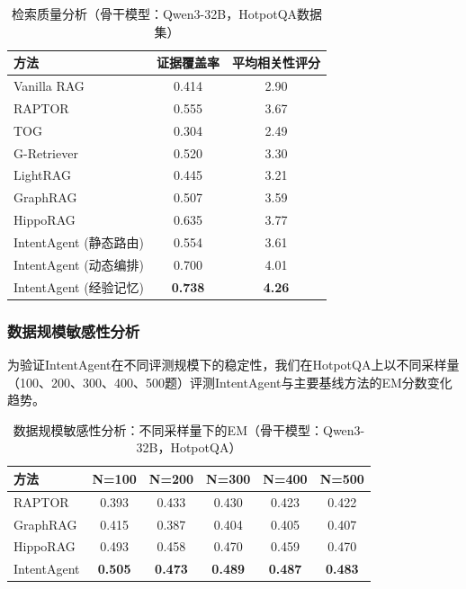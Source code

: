 \documentclass[runningheads]{llncs}
\begin{document}
\begin{table}[htbp]
\centering
\caption{检索质量分析（骨干模型：Qwen3-32B，HotpotQA数据集）}
\label{tab:retrieval_quality}
\begin{tabular}{l|cc}
\toprule
\textbf{方法} & \textbf{证据覆盖率} & \textbf{平均相关性评分} \\
\midrule
Vanilla RAG & 0.414 & 2.90 \\
RAPTOR & 0.555 & 3.67 \\
TOG & 0.304 & 2.49 \\
G-Retriever & 0.520 & 3.30 \\
LightRAG & 0.445 & 3.21 \\
GraphRAG & 0.507 & 3.59 \\
HippoRAG & 0.635 & 3.77 \\
\midrule
IntentAgent (静态路由) & 0.554 & 3.61 \\
IntentAgent (动态编排) & 0.700 & 4.01 \\
IntentAgent (经验记忆) & \textbf{0.738} & \textbf{4.26} \\
\bottomrule
\end{tabular}
\end{table}

\subsubsection{数据规模敏感性分析}

为验证IntentAgent在不同评测规模下的稳定性，我们在HotpotQA上以不同采样量（100、200、300、400、500题）评测IntentAgent与主要基线方法的EM分数变化趋势。

\begin{table}[htbp]
\centering
\caption{数据规模敏感性分析：不同采样量下的EM（骨干模型：Qwen3-32B，HotpotQA）}
\label{tab:scale_sensitivity}
\begin{tabular}{l|ccccc}
\toprule
\textbf{方法} & \textbf{N=100} & \textbf{N=200} & \textbf{N=300} & \textbf{N=400} & \textbf{N=500} \\
\midrule
RAPTOR & 0.393 & 0.433 & 0.430 & 0.423 & 0.422 \\
GraphRAG & 0.415 & 0.387 & 0.404 & 0.405 & 0.407 \\
HippoRAG & 0.493 & 0.458 & 0.470 & 0.459 & 0.470 \\
IntentAgent & \textbf{0.505} & \textbf{0.473} & \textbf{0.489} & \textbf{0.487} & \textbf{0.483} \\
\bottomrule
\end{tabular}
\end{table}
\end{document}
